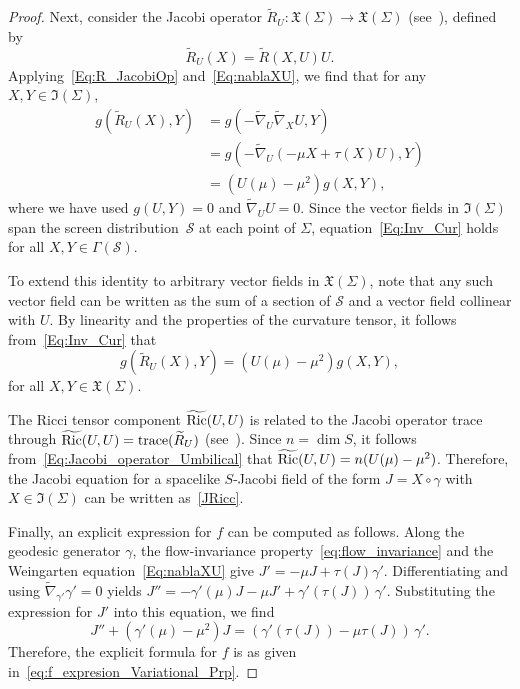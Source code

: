 \documentclass[11pt]{article}
\numberwithin{equation}{section}
\begin{document}
\begin{proof}
		Next, consider the Jacobi operator $\widetilde{R}_U \colon \mathfrak{X}(\Sigma) \to \mathfrak{X}(\Sigma)$ (see~\cite[p.~219]{oneill}), defined by
		\[
		\widetilde{R}_U(X) = \widetilde{R}(X, U)U.
		\]
		Applying~\eqref{Eq:R_JacobiOp} and~\eqref{Eq:nablaXU}, we find that for any $X, Y \in \mathfrak{I}(\Sigma)$,
		\begin{align}
			g(\widetilde{R}_U(X), Y) 
			&= g(-\widetilde{\nabla}_U \widetilde{\nabla}_X U, Y) \nonumber \\
			&= g(-\widetilde{\nabla}_U (-\mu X + \tau(X) U), Y) \nonumber \\
			&= (U(\mu) - \mu^2) g(X, Y), \label{Eq:Inv_Cur}
		\end{align}
		where we have used $g(U, Y) = 0$ and $\widetilde{\nabla}_U U = 0$. Since the vector fields in $\mathfrak{I}(\Sigma)$ span the screen distribution~$\mathcal{S}$ at each point of $\Sigma$, equation~\eqref{Eq:Inv_Cur} holds for all $X, Y \in \Gamma(\mathcal{S})$. 
		
		To extend this identity to arbitrary vector fields in $\mathfrak{X}(\Sigma)$, note that any such vector field can be written as the sum of a section of $\mathcal{S}$ and a vector field collinear with $U$. By linearity and the properties of the curvature tensor, it follows from~\eqref{Eq:Inv_Cur} that
		\begin{equation}\label{Eq:Jacobi_operator_Umbilical}
			g(\widetilde{R}_U(X), Y) = (U(\mu) - \mu^2) g(X, Y),
		\end{equation}
		for all $X, Y \in \mathfrak{X}(\Sigma)$.
		
		The Ricci tensor component $\widetilde{{\rm Ric}}(U, U)$ is related to the Jacobi operator trace through $\widetilde{{\rm Ric}}(U, U) =  \mathrm{trace}(\widetilde{R}_U)$ (see~\cite[Lem.~8.9]{oneill}). Since $n = \dim S$, it follows from~\eqref{Eq:Jacobi_operator_Umbilical} that $\widetilde{{\rm Ric}}(U, U) = n(U(\mu) - \mu^2)$. Therefore, the Jacobi equation for a spacelike $S$-Jacobi field of the form $J = X \circ \gamma$ with $X \in \mathfrak{I}(\Sigma)$ can be written as~\eqref{JRicc}.
		
		Finally, an explicit expression for $f$ can be computed as follows. Along the geodesic generator $\gamma$, the flow-invariance property~\eqref{eq:flow_invariance} and the Weingarten equation~\eqref{Eq:nablaXU} give $J' = -\mu J + \tau(J) \gamma'$. Differentiating and using $\widetilde{\nabla}_{\gamma'} \gamma' = 0$ yields $J'' = -\gamma'(\mu) J - \mu J' + \gamma'(\tau(J))\, \gamma'$. Substituting the expression for $J'$ into this equation, we find
		\begin{equation*}
			J'' + (\gamma'(\mu) - \mu^2) J = (\gamma'(\tau(J)) - \mu \tau(J))\, \gamma'.
		\end{equation*}
		Therefore, the explicit formula for $f$ is as given in~\eqref{eq:f_expresion_Variational_Prp}.
	\end{proof}
	
\end{document}
